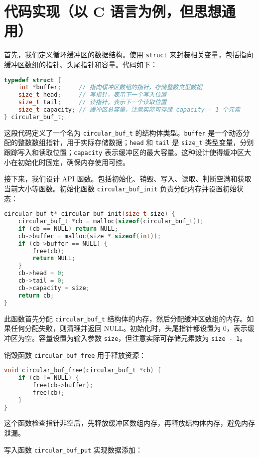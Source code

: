 \chapter{代码实现（以 C 语言为例，但思想通用）}
首先，我们定义循环缓冲区的数据结构。使用 \texttt{struct} 来封装相关变量，包括指向缓冲区数组的指针、头尾指针和容量。代码如下：\par
\begin{lstlisting}[language=c]
typedef struct {
    int *buffer;     // 指向缓冲区数组的指针，存储整数类型数据
    size_t head;     // 写指针，表示下一个写入位置
    size_t tail;     // 读指针，表示下一个读取位置
    size_t capacity; // 缓冲区总容量，注意实际可存储 capacity - 1 个元素
} circular_buf_t;
\end{lstlisting}
这段代码定义了一个名为 \texttt{circular\_{}buf\_{}t} 的结构体类型。\texttt{buffer} 是一个动态分配的整数数组指针，用于实际存储数据；\texttt{head} 和 \texttt{tail} 是 \texttt{size\_{}t} 类型变量，分别跟踪写入和读取位置；\texttt{capacity} 表示缓冲区的最大容量。这种设计使得缓冲区大小在初始化时固定，确保内存使用可控。\par
接下来，我们设计 API 函数。包括初始化、销毁、写入、读取、判断空满和获取当前大小等函数。初始化函数 \texttt{circular\_{}buf\_{}init} 负责分配内存并设置初始状态：\par
\begin{lstlisting}[language=c]
circular_buf_t* circular_buf_init(size_t size) {
    circular_buf_t *cb = malloc(sizeof(circular_buf_t));
    if (cb == NULL) return NULL;
    cb->buffer = malloc(size * sizeof(int));
    if (cb->buffer == NULL) {
        free(cb);
        return NULL;
    }
    cb->head = 0;
    cb->tail = 0;
    cb->capacity = size;
    return cb;
}
\end{lstlisting}
此函数首先分配 \texttt{circular\_{}buf\_{}t} 结构体的内存，然后分配缓冲区数组的内存。如果任何分配失败，则清理并返回 NULL。初始化时，头尾指针都设置为 0，表示缓冲区为空。容量设置为输入参数 \texttt{size}，但注意实际可存储元素数为 \texttt{size - 1}。\par
销毁函数 \texttt{circular\_{}buf\_{}free} 用于释放资源：\par
\begin{lstlisting}[language=c]
void circular_buf_free(circular_buf_t *cb) {
    if (cb != NULL) {
        free(cb->buffer);
        free(cb);
    }
}
\end{lstlisting}
这个函数检查指针非空后，先释放缓冲区数组内存，再释放结构体内存，避免内存泄漏。\par
写入函数 \texttt{circular\_{}buf\_{}put} 实现数据添加：\par
